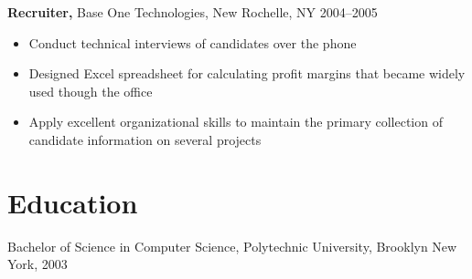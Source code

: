 \documentclass[margin]{res}
\begin{document}
\begin{resume}
{\bf Recruiter,} Base One Technologies, New Rochelle, NY \hfill 2004--2005
\begin{itemize}
  \item Conduct technical interviews of candidates over the phone
  \item Designed Excel spreadsheet for calculating profit margins that became widely used though the office
  \item Apply excellent organizational skills to maintain the primary collection of candidate information on several projects
\end{itemize}

\section{Education}
Bachelor of Science in Computer Science, Polytechnic University, Brooklyn New
York, 2003

\end{resume}
\end{document}
